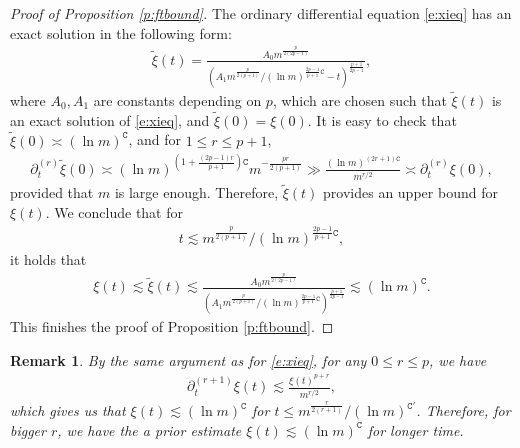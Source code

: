 \documentclass{article}
\numberwithin{equation}{section}
\newcommand{\fC}{{\mathtt C}}
\renewcommand{\leq}{\leqslant}
\newcommand{\del}{\partial}
\newcommand{\1}{\mathds{1}}
\theoremstyle{plain} %
\newtheorem{remark}[theorem]{Remark}
\begin{document}
\begin{proof}[Proof of Proposition \ref{p:ftbound}]
The ordinary differential equation \eqref{e:xieq} has an exact solution in the following form:
\begin{align*}
\tilde \xi(t)=\frac{A_0 m^{\frac{p}{2(2p-1)}}}{\left(A_1m^{\frac{p}{2(p+1)}}/(\ln m)^{\frac{2p-1}{p+1}\fC}-t\right)^{\frac{p+1}{2p-1}}},
\end{align*}
where $A_0, A_1$ are constants depending on $p$, which are chosen such that $\tilde \xi(t)$ is an exact solution of \eqref{e:xieq}, and $\tilde \xi(0)=\xi(0)$. It is easy to check that $\tilde \xi(0)\asymp (\ln m)^{\fC}$, and for $1\leq r\leq p+1$,
\begin{align*}
\del_t^{(r)}\tilde \xi(0)\asymp (\ln m)^{\left(1+\frac{(2p-1)r}{p+1}\right)\fC}m^{-\frac{pr}{2(p+1)}}\gg\frac{(\ln m)^{(2r+1)\fC}}{m^{r/2}}\asymp \del_t^{(r)}\xi(0),
\end{align*}
provided that $m$ is large enough.
Therefore, $\tilde \xi(t)$ provides an upper bound for $\xi(t)$. We conclude that for 
\begin{align*}
t\lesssim m^{\frac{p}{2(p+1)}}/(\ln m)^{\frac{2p-1}{p+1}\fC},
\end{align*}
it holds that
\begin{align*}
\xi(t)\lesssim \tilde \xi(t)\lesssim 
\frac{A_0 m^{\frac{p}{2(2p-1)}}}{\left(A_1m^{\frac{p}{2(p+1)}}/(\ln m)^{\frac{2p-1}{p+1}\fC}\right)^{\frac{p+1}{2p-1}}}\lesssim (\ln m)^{\fC}.
\end{align*}
This finishes the proof of Proposition \ref{p:ftbound}.
\end{proof}


\begin{remark}
By the same argument as for \eqref{e:xieq}, for any $0 \leq r\leq p$, we have
\begin{align*}
\del^{(r+1)}_{t}\xi(t)\lesssim \frac{\xi(t)^{p+r}}{m^{r/2}},
\end{align*}
which gives us that $\xi(t)\lesssim (\ln m)^\fC$ for $t\leq m^{\frac{r}{2(r+1)}}/(\ln m)^{\fC'}$. Therefore, for bigger $r$, we have the a prior estimate $\xi(t)\lesssim (\ln m)^\fC$ for longer time. 

\end{remark}
\end{document}
